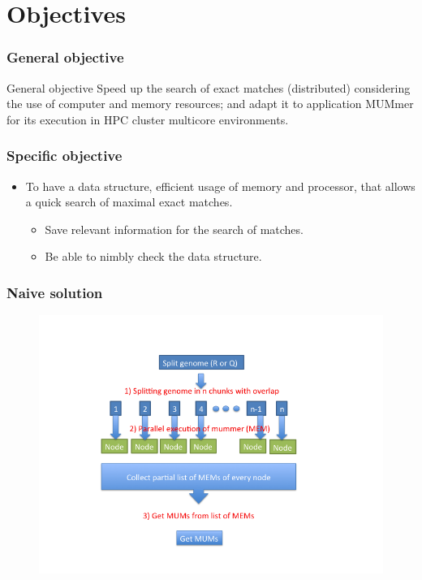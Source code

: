 \documentclass{beamer}
\begin{document}
\section{Objectives}
\begin{frame}
 \frametitle{General objective}
 \begin{block}{General objective}
Speed up the search of exact matches (distributed) considering the use of computer and memory resources; and adapt it to application MUMmer for its execution in HPC cluster multicore environments.
\end{block}
\end{frame}
\begin{frame}
\frametitle{Specific objective}
\begin{block}{}
\begin{itemize}
\item To have a data structure, efficient usage of memory and processor, that allows a quick search of maximal exact matches.
  \begin{itemize}
    \item Save relevant information for the search of matches.
    \item Be able to nimbly check the data structure.
  \end{itemize}
  \end{itemize}
\end{block}
\end{frame}
\begin{frame}
  \frametitle{Naive solution}
  \begin{figure}\includegraphics[scale=0.45]{algorithm.png}\end{figure}
\end{frame}
\end{document}
